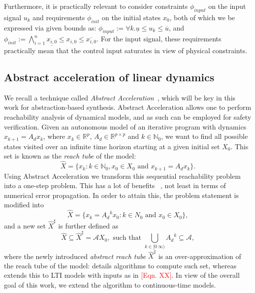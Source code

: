\documentclass[twocolumn]{autart}    %
\newcommand{\mat}[1]{{#1}}
\renewcommand{\vec}[1]{{#1}}
\renewcommand{\note}[1]{\textcolor{red}{[#1]}}
\begin{document}
Furthermore, it is practically relevant to consider constraints $\phi_\mathit{input}$ on the input
signal $u_{k}$ and requirements $\phi_\mathit{init}$ on the initial states $x_0$, 
both of which we be expressed via given bounds as: 
$\phi_\mathit{input} := {\forall k.\underline{u} \leq u_{k} \leq \overline{u}} $, 
and $\phi_\mathit{init} := \bigwedge_{i=1}^{n} \underline{x_{i,0}} \leq x_{i,0} \leq \overline{x_{i,0}}$. 
For the input signal, these requirements practically mean that the control input saturates in view of physical constraints. 

\subsection{Abstract acceleration of linear dynamics} 
\label{ssec:aa}
 
We recall a technique called \emph{Abstract Acceleration}~\cite{JSS14,cattaruzza2015unbounded}, 
which will be key in this work for abstraction-based synthesis.  
Abstract Acceleration allows one to perform reachability analysis of dynamical models, 
and as such can be employed for safety verification. 
% 
Given an autonomous model of an iterative program with dynamics 
%
$\vec{x}_{k+1}=\mat{A_d}\vec{x}_k$, 
where $\vec{x}_k \in \mathbb{R}^p$, $\mat{A_d} \in \mathbb{R}^{p \times p}$ and $k \in \mathbb N_0$, 
%
we want to find all possible states visited over an infinite time horizon starting at a given initial set $X_0$.  
This set is known as the \emph{reach tube} of the model: 
%
\begin{equation}
\hat{X} = \{ \vec{x}_k: k \in \mathbb N_0, \vec{x}_0 \in X_0 \text{ and } \vec{x}_{k+1}=\mat{A_d}\vec{x}_k\}.
\end{equation}
%
Using Abstract Acceleration we transform this sequential reachability problem into a one-step problem. 
This has a lot of benefits ~\cite{JSS14}, not least in terms of numerical error propagation.   
In order to attain this, 
the problem statement is modified 
into 
%
\begin{equation}
\hat{X} = \{ \vec{x}_k=\mat{A_d}^k\vec{x}_0: k \in N_0 \text{ and } \vec{x}_0 \in X_0 \}, 
\end{equation}
%
and a new 
set $\hat{X}^\sharp$ is further defined as 
%
\begin{equation}\label{eq:aa_reachtube}
\hat{X} \subseteq \hat{X}^\sharp = \mathcal{A}X_0, \text{ such that } \bigcup_{k \in [0\ \infty)} \mat{A_d}^k \subseteq \mathcal{A}, 
\end{equation}
%
where the newly introduced \emph{abstract reach tube} $\hat{X}^\sharp$ is an
over-approximation of the reach tube of the model: 
\cite{JSS14} details algorithms to compute such set, 
whereas \cite{cattaruzza2015unbounded} extends this to LTI models with inputs as in \note{Eqn. XX}.  
In view of the overall goal of this work, 
we extend the algorithm to continuous-time models.  
\end{document}
